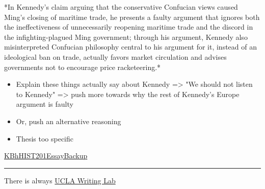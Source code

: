 \documentclass[letterpaper]{article}
\begin{document}
*In Kennedy's claim arguing that the conservative Confucian views caused
Ming's closing of maritime trade, he presents a faulty argument that
ignores both the ineffectiveness of unnecessarily reopening maritime
trade and the discord in the infighting-plagued Ming government; through
his argument, Kennedy also misinterpreted Confucian philosophy central
to his argument for it, instead of an ideological ban on trade, actually
favors market circulation and advises governments not to encourage price
racketeering.*

\begin{itemize}
\item Explain these things actually say about Kennedy => "We should not
listen to Kennedy" => push more towards why the rest of Kennedy's
Europe argument is faulty
\item Or, push an alternative reasoning
\item Thesis too specific
\end{itemize}

\href{KBhHIST201EssayBackup.org}{KBhHIST201EssayBackup}

\noindent\rule{\textwidth}{0.5pt}

There is always
\href{https://wp.ucla.edu/wp-content/uploads/2016/01/UWC\_handouts\_What-How-So-What-Thesis-revised-5-4-15-RZ.pdf}{UCLA
Writing Lab}
\end{document}
